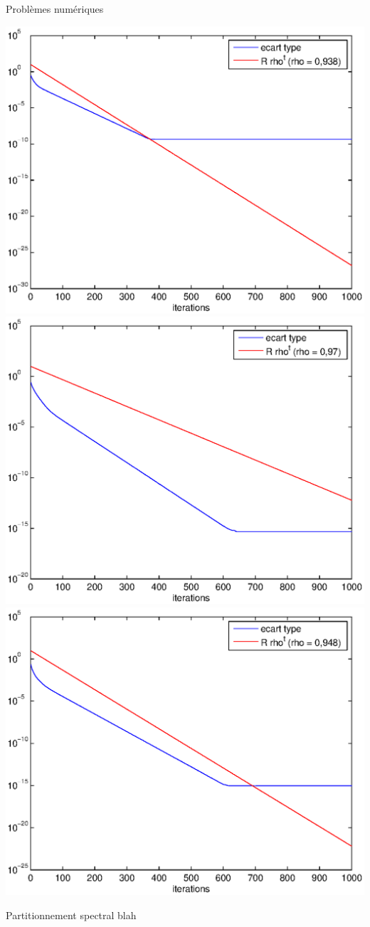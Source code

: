 \documentclass{beamer}
\begin{document}
\begin{frame}{Problèmes numériques}
	\begin{center}
		\includegraphics[width=.4\textwidth]{var_rho_0938}
		\includegraphics[width=.4\textwidth]{var_rho_097}\\
		\includegraphics[width=.6\textwidth]{var_rho_0948}
	\end{center}
\end{frame}

\begin{frame}{Partitionnement spectral}
  blah
\end{frame}
\end{document}
